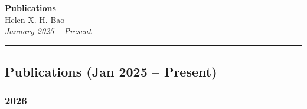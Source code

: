 \documentclass[10pt,a4paper]{article}
\begin{document}
\begin{center}
  {\LARGE\bfseries\color{NavyBlue} Publications}\\[4pt]
  {\large Helen X. H. Bao}\\[2pt]
  {\itshape January 2025 -- Present}
\end{center}

\vspace{6pt}
\hrule
\vspace{12pt}

\subsection{Publications (Jan 2025 --
Present)}\label{publications-jan-2025-present}

\subsubsection{2026}\label{section}
\end{document}
